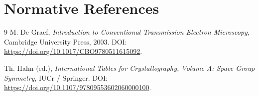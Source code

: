 \documentclass[11pt]{article}
\begin{document}
\section{Normative References}

\begin{thebibliography}{9}
M. De Graef,
\textit{Introduction to Conventional Transmission Electron Microscopy},
Cambridge University Press, 2003.
DOI: \url{https://doi.org/10.1017/CBO9780511615092}.

Th. Hahn (ed.),
\textit{International Tables for Crystallography, Volume A: Space-Group Symmetry},
IUCr / Springer.
DOI: \url{https://doi.org/10.1107/97809553602060000100}.
\end{thebibliography}
\end{document}
